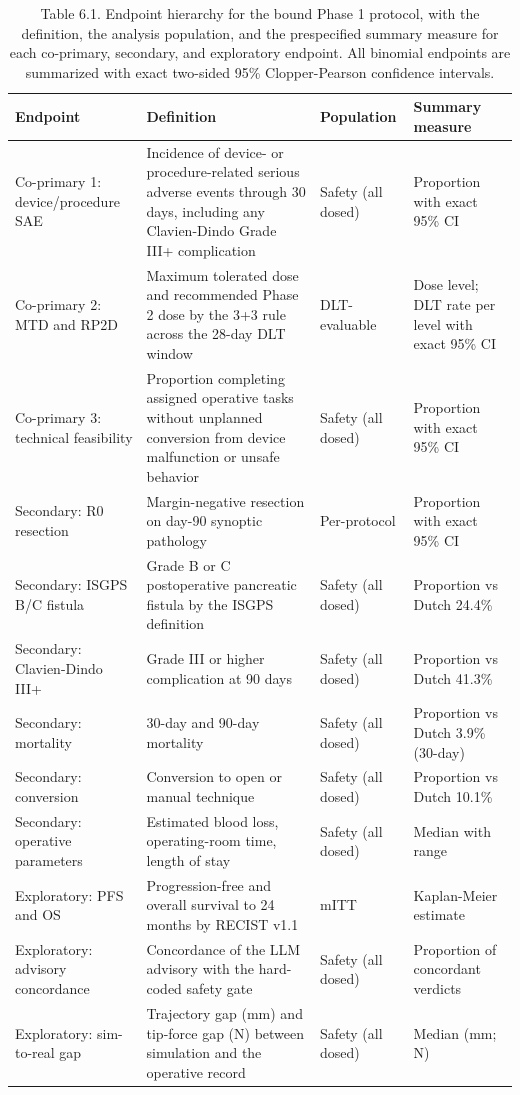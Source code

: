 \begin{table}[t]
\caption{Table 6.1. Endpoint hierarchy for the bound Phase 1 protocol, with the
definition, the analysis population, and the prespecified summary measure for each
co-primary, secondary, and exploratory endpoint. All binomial endpoints are
summarized with exact two-sided 95\% Clopper-Pearson confidence intervals.}
\label{tab:sec06-endpoints}
\centering
\begin{tabularx}{\textwidth}{L{3.0cm} Y L{2.6cm} L{2.6cm}}
\toprule
\textbf{Endpoint} & \textbf{Definition} & \textbf{Population} & \textbf{Summary measure} \\
\midrule
Co-primary 1: device/procedure SAE & Incidence of device- or procedure-related serious adverse events through 30 days, including any Clavien-Dindo Grade III+ complication & Safety (all dosed) & Proportion with exact 95\% CI \\
Co-primary 2: MTD and RP2D & Maximum tolerated dose and recommended Phase 2 dose by the 3+3 rule across the 28-day DLT window & DLT-evaluable & Dose level; DLT rate per level with exact 95\% CI \\
Co-primary 3: technical feasibility & Proportion completing assigned operative tasks without unplanned conversion from device malfunction or unsafe behavior & Safety (all dosed) & Proportion with exact 95\% CI \\
Secondary: R0 resection & Margin-negative resection on day-90 synoptic pathology & Per-protocol & Proportion with exact 95\% CI \\
Secondary: ISGPS B/C fistula & Grade B or C postoperative pancreatic fistula by the ISGPS definition & Safety (all dosed) & Proportion vs Dutch 24.4\% \\
Secondary: Clavien-Dindo III+ & Grade III or higher complication at 90 days & Safety (all dosed) & Proportion vs Dutch 41.3\% \\
Secondary: mortality & 30-day and 90-day mortality & Safety (all dosed) & Proportion vs Dutch 3.9\% (30-day) \\
Secondary: conversion & Conversion to open or manual technique & Safety (all dosed) & Proportion vs Dutch 10.1\% \\
Secondary: operative parameters & Estimated blood loss, operating-room time, length of stay & Safety (all dosed) & Median with range \\
Exploratory: PFS and OS & Progression-free and overall survival to 24 months by RECIST v1.1 & mITT & Kaplan-Meier estimate \\
Exploratory: advisory concordance & Concordance of the LLM advisory with the hard-coded safety gate & Safety (all dosed) & Proportion of concordant verdicts \\
Exploratory: sim-to-real gap & Trajectory gap (mm) and tip-force gap (N) between simulation and the operative record & Safety (all dosed) & Median (mm; N) \\
\bottomrule
\end{tabularx}
\end{table}

